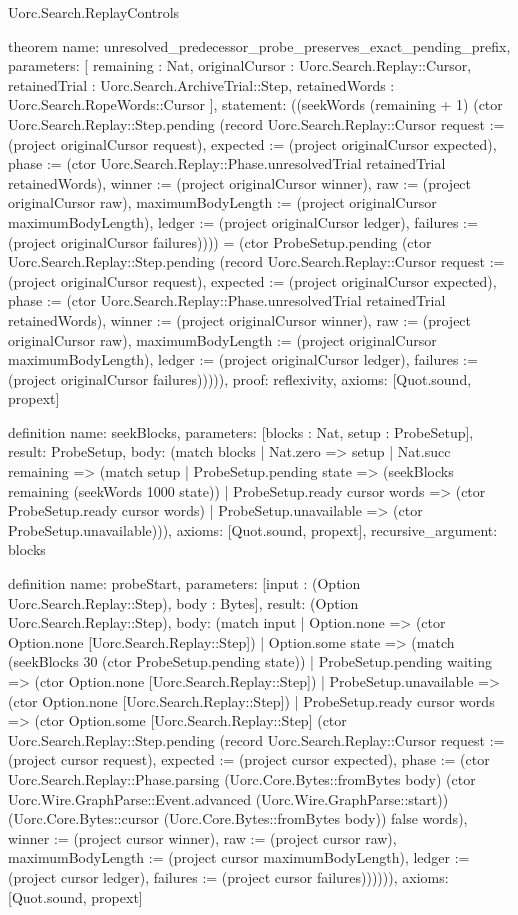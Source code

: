 \begin{lexlean}{Uorc.Search.ReplayControls}
\begin{semanticmodule}
theorem{
  name: unresolved_predecessor_probe_preserves_exact_pending_prefix,
  parameters: [
    remaining : Nat,
    originalCursor : Uorc.Search.Replay::Cursor,
    retainedTrial : Uorc.Search.ArchiveTrial::Step,
    retainedWords : Uorc.Search.RopeWords::Cursor
  ],
  statement: ((seekWords (remaining + 1) (ctor Uorc.Search.Replay::Step.pending (record Uorc.Search.Replay::Cursor {request := (project originalCursor request), expected := (project originalCursor expected), phase := (ctor Uorc.Search.Replay::Phase.unresolvedTrial retainedTrial retainedWords), winner := (project originalCursor winner), raw := (project originalCursor raw), maximumBodyLength := (project originalCursor maximumBodyLength), ledger := (project originalCursor ledger), failures := (project originalCursor failures)}))) = (ctor ProbeSetup.pending (ctor Uorc.Search.Replay::Step.pending (record Uorc.Search.Replay::Cursor {request := (project originalCursor request), expected := (project originalCursor expected), phase := (ctor Uorc.Search.Replay::Phase.unresolvedTrial retainedTrial retainedWords), winner := (project originalCursor winner), raw := (project originalCursor raw), maximumBodyLength := (project originalCursor maximumBodyLength), ledger := (project originalCursor ledger), failures := (project originalCursor failures)})))),
  proof: reflexivity{},
  axioms: [Quot.sound, propext]
}

definition{
  name: seekBlocks,
  parameters: [blocks : Nat, setup : ProbeSetup],
  result: ProbeSetup,
  body: (match blocks
    | Nat.zero => setup
    | Nat.succ remaining => (match setup
      | ProbeSetup.pending state => (seekBlocks remaining (seekWords 1000 state))
      | ProbeSetup.ready cursor words => (ctor ProbeSetup.ready cursor words)
      | ProbeSetup.unavailable => (ctor ProbeSetup.unavailable))),
  axioms: [Quot.sound, propext],
  recursive_argument: blocks
}

definition{
  name: probeStart,
  parameters: [input : (Option Uorc.Search.Replay::Step), body : Bytes],
  result: (Option Uorc.Search.Replay::Step),
  body: (match input
    | Option.none => (ctor Option.none [Uorc.Search.Replay::Step])
    | Option.some state => (match (seekBlocks 30 (ctor ProbeSetup.pending state))
      | ProbeSetup.pending waiting => (ctor Option.none [Uorc.Search.Replay::Step])
      | ProbeSetup.unavailable => (ctor Option.none [Uorc.Search.Replay::Step])
      | ProbeSetup.ready cursor words => (ctor Option.some [Uorc.Search.Replay::Step] (ctor Uorc.Search.Replay::Step.pending (record Uorc.Search.Replay::Cursor {request := (project cursor request), expected := (project cursor expected), phase := (ctor Uorc.Search.Replay::Phase.parsing (Uorc.Core.Bytes::fromBytes body) (ctor Uorc.Wire.GraphParse::Event.advanced (Uorc.Wire.GraphParse::start)) (Uorc.Core.Bytes::cursor (Uorc.Core.Bytes::fromBytes body)) false words), winner := (project cursor winner), raw := (project cursor raw), maximumBodyLength := (project cursor maximumBodyLength), ledger := (project cursor ledger), failures := (project cursor failures)}))))),
  axioms: [Quot.sound, propext]
}


\end{semanticmodule}
\end{lexlean}
